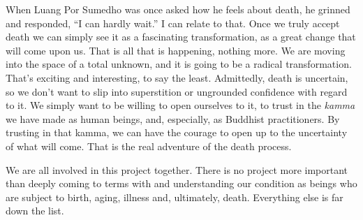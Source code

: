 When Luang Por Sumedho was once asked how he feels about death, he 
grinned and responded, ``I can hardly wait.'' I can relate to that. 
Once we truly accept death we can simply see it as a fascinating 
transformation, as a great change that will come upon us. That is all 
that is happening, nothing more. We are moving into the space of a 
total unknown, and it is going to be a radical transformation. That's 
exciting and interesting, to say the least. Admittedly, death is 
uncertain, so we don't want to slip into superstition or ungrounded 
confidence with regard to it. We simply want to be willing to open 
ourselves to it, to trust in the \emph{kamma} we have made as human 
beings, and, especially, as Buddhist practitioners. By trusting in that 
kamma, we can have the courage to open up to the uncertainty of what 
will come. That is the real adventure of the death process.

We are all involved in this project together. There is no project more 
important than deeply coming to terms with and understanding our 
condition as beings who are subject to birth, aging, illness and, 
ultimately, death. Everything else is far down the list.

